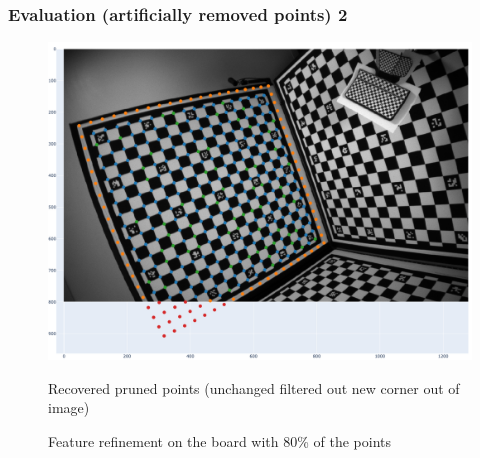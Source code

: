 \documentclass{beamer}
\begin{document}
\begin{frame}
	\frametitle{Evaluation (artificially removed points) 2}
	\begin{figure}
		\centering
		\includegraphics[width=0.7\linewidth]{refined_pruned_corners.png}
		\caption{Recovered pruned points
			(\textcolor[HTML]{1f77b4}{unchanged}
			\textcolor[HTML]{ff7f0e}{filtered out}
			\textcolor[HTML]{2ca02c}{new corner}
			\textcolor[HTML]{d62728}{out of image})}
		\caption{Feature refinement on the board with 80\% of the points}
	\end{figure}

\end{frame}
\end{document}
